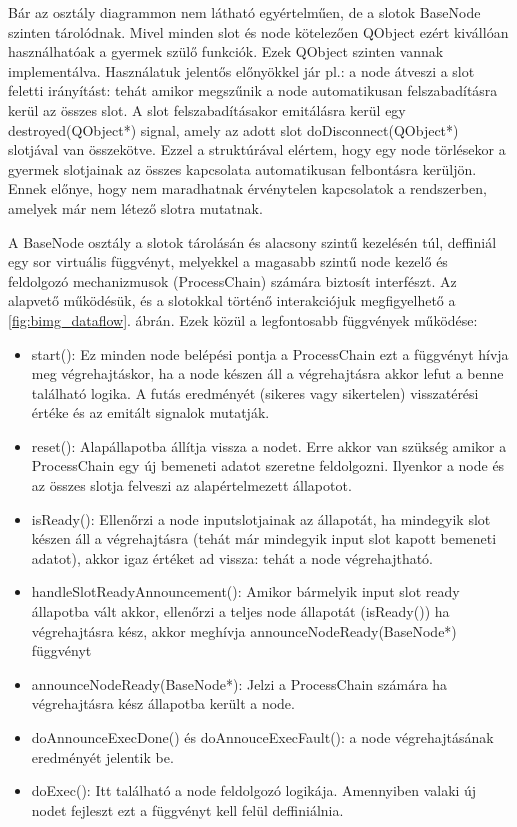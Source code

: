 \documentclass[a4paper,12pt,oneside]{report}
\begin{document}
Bár az osztály diagrammon nem látható egyértelműen, de a slotok BaseNode szinten tárolódnak. Mivel minden slot és node kötelezően QObject ezért kivállóan használhatóak a gyermek szülő funkciók. Ezek QObject szinten vannak implementálva. Használatuk jelentős előnyökkel jár pl.: a node átveszi a slot feletti irányítást: tehát amikor megszűnik a node automatikusan felszabadításra kerül az összes slot. A slot felszabadításakor emitálásra kerül egy destroyed(QObject*) signal, amely az adott slot doDisconnect(QObject*) slotjával van összekötve. Ezzel a struktúrával elértem, hogy egy node törlésekor a gyermek slotjainak az összes kapcsolata automatikusan felbontásra kerüljön. Ennek előnye, hogy nem maradhatnak érvénytelen kapcsolatok a rendszerben, amelyek már nem létező slotra mutatnak.

 A BaseNode osztály a slotok tárolásán és alacsony szintű kezelésén túl, deffiniál egy sor virtuális függvényt, melyekkel a magasabb szintű node kezelő és feldolgozó mechanizmusok (ProcessChain) számára biztosít interfészt. Az alapvető működésük, és a slotokkal történő interakciójuk megfigyelhető a \ref{fig:bimg_dataflow}. ábrán. Ezek közül a legfontosabb függvények működése:
\begin{itemize}
	\itemsep0em
	\item start(): Ez minden node belépési pontja a ProcessChain ezt a függvényt hívja meg végrehajtáskor, ha a node készen áll a végrehajtásra akkor lefut a benne található logika. A futás eredményét (sikeres vagy sikertelen) visszatérési értéke és az emitált signalok mutatják.
	\item reset(): Alapállapotba állítja vissza a nodet. Erre akkor van szükség amikor a ProcessChain egy új bemeneti adatot szeretne feldolgozni. Ilyenkor a node és az összes slotja felveszi az alapértelmezett állapotot.
	\item isReady(): Ellenőrzi a node inputslotjainak az állapotát, ha mindegyik slot készen áll a végrehajtásra (tehát már mindegyik input slot kapott bemeneti adatot), akkor igaz értéket ad vissza: tehát a node végrehajtható.
	\item handleSlotReadyAnnouncement(): Amikor bármelyik input slot ready állapotba vált akkor, ellenőrzi a teljes node állapotát (isReady()) ha végrehajtásra kész, akkor meghívja announceNodeReady(BaseNode*) függvényt
	\item announceNodeReady(BaseNode*): Jelzi a ProcessChain számára ha végrehajtásra kész állapotba került a node.
	\item doAnnounceExecDone() és doAnnouceExecFault(): a node végrehajtásának eredményét jelentik be.
	
	\item doExec(): Itt található a node feldolgozó logikája. Amennyiben valaki új nodet fejleszt ezt a függvényt kell felül deffiniálnia. 
\end{itemize}
\end{document}
